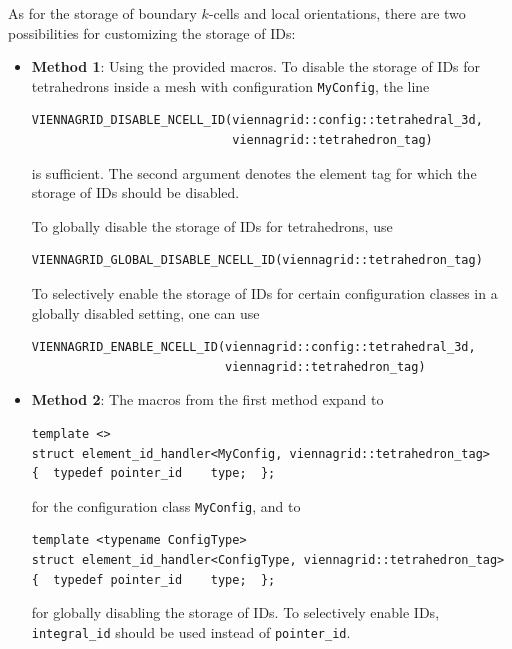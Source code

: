 \begin{itemize}
As for the storage of boundary $k$-cells and local orientations, there are two possibilities for customizing the storage of IDs:
\begin{itemize}
 \item \textbf{Method 1}: Using the provided macros. To disable the storage of IDs for tetrahedrons inside a mesh with configuration \lstinline|MyConfig|, the line
 \begin{lstlisting}
VIENNAGRID_DISABLE_NCELL_ID(viennagrid::config::tetrahedral_3d,
                            viennagrid::tetrahedron_tag)
 \end{lstlisting}
 is sufficient. The second argument denotes the element tag for which the storage of IDs should be disabled.

 To globally disable the storage of IDs for tetrahedrons, use
 \begin{lstlisting}
VIENNAGRID_GLOBAL_DISABLE_NCELL_ID(viennagrid::tetrahedron_tag)
 \end{lstlisting}
 To selectively enable the storage of IDs for certain configuration classes in a globally disabled setting, one can use
 \begin{lstlisting}
VIENNAGRID_ENABLE_NCELL_ID(viennagrid::config::tetrahedral_3d,
                           viennagrid::tetrahedron_tag)
 \end{lstlisting}

 \item \textbf{Method 2}:
The macros from the first method expand to
\begin{lstlisting}
template <>
struct element_id_handler<MyConfig, viennagrid::tetrahedron_tag>
{  typedef pointer_id    type;  };
\end{lstlisting}
for the configuration class \lstinline|MyConfig|, and to
\begin{lstlisting}
template <typename ConfigType>
struct element_id_handler<ConfigType, viennagrid::tetrahedron_tag>
{  typedef pointer_id    type;  };
\end{lstlisting}
for globally disabling the storage of IDs. To selectively enable IDs, \lstinline|integral_id| should be used instead of \lstinline|pointer_id|.


\end{itemize}





\end{itemize}

